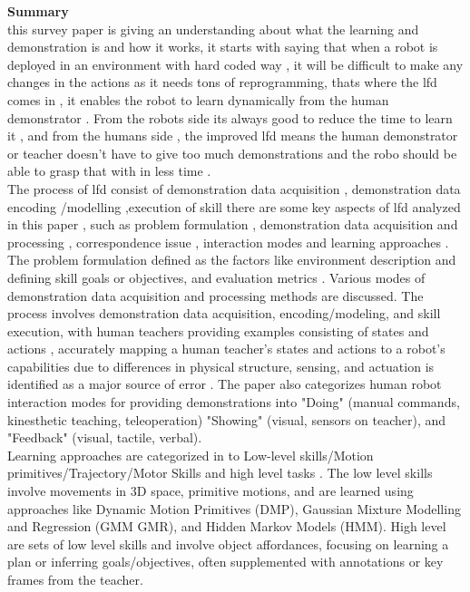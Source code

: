 \documentclass[report.tex]{subfiles}
\begin{document}
\noindent\textbf{Summary} \\
this survey paper is giving an understanding about what the learning and demonstration is and how it works, it starts with saying that when a robot is deployed in an environment with hard coded way , it will be difficult to make any changes in the actions as it needs tons of reprogramming, thats where the lfd comes in , it enables the robot to learn dynamically from the human demonstrator . From the robots side its always good to reduce the time to learn it , and from the humans side , the improved lfd means the human demonstrator or teacher doesn’t have to give too much demonstrations and the robo should be able to grasp that with in less time . \\The process of lfd consist of  demonstration data acquisition , demonstration data encoding /modelling ,execution of skill 
\noindent\textbf{}there are some key aspects of lfd analyzed in this paper , such as problem formulation , demonstration data acquisition and processing , correspondence issue , interaction modes and learning approaches . The problem formulation defined as the factors like environment description and  defining skill goals or objectives, and evaluation metrics . Various modes of demonstration data acquisition and processing methods are discussed. The process involves demonstration data acquisition, encoding/modeling, and skill execution, with human teachers providing examples consisting of states and actions , accurately mapping a human teacher's states and actions to a robot's capabilities due to differences in physical structure, sensing, and actuation is identified as a major source of error . The paper also  categorizes human robot interaction modes for providing demonstrations into "Doing" (manual commands, kinesthetic teaching, teleoperation) "Showing" (visual, sensors on teacher), and "Feedback" (visual, tactile, verbal).\\




Learning approaches  are categorized in to Low-level skills/Motion primitives/Trajectory/Motor Skills and high level tasks .  The low level skills involve movements in 3D space, primitive motions, and are learned using approaches like Dynamic Motion Primitives (DMP), Gaussian Mixture Modelling and Regression (GMM GMR), and Hidden Markov Models (HMM). High level 
 are sets of low level skills and involve object affordances, focusing on learning a plan or inferring goals/objectives, often supplemented with annotations or key frames from the teacher.\\
\end{document}
